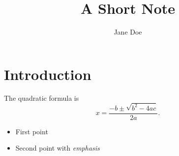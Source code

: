 \documentclass[11pt]{article}
\title{A Short Note}
\author{Jane Doe}
\begin{document}
\maketitle

\section{Introduction}
The quadratic formula is
\begin{equation}
  x = \frac{-b \pm \sqrt{b^2 - 4ac}}{2a}.
\end{equation}

\begin{itemize}
  \item First point
  \item Second point with \emph{emphasis}
\end{itemize}
\end{document}
